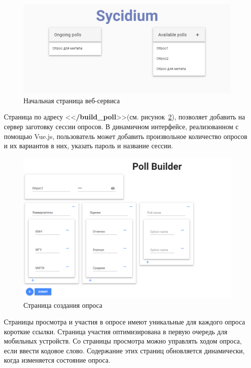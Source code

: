 \begin{figure}[H]
	\centering
	\includegraphics[width=\textwidth]{img/index.PNG}
	\caption{\label{fig:index} Начальная страница веб-сервиса}
\end{figure}

Страница по адресу <<\textbf{/build\_poll}>>(см. рисунок~\ref{fig:builder}), позволяет добавить на сервер заготовку сессии опросов. В динамичном интерфейсе, реализованном с помощью Vue.js, пользователь может добавить произвольное количество опросов и их вариантов в них, указать пароль и название сессии.

 \begin{figure}[H]
 	\centering
 	\includegraphics[width=\textwidth]{img/builder.PNG}
 	\caption{\label{fig:builder} Страница создания опроса}
 \end{figure}
 
  
Страницы просмотра и участия в опросе имеют уникальные для каждого опроса короткие ссылки. Страница участия оптимизирована в первую очередь для мобильных устройств. Со страницы просмотра можно управлять ходом опроса, если ввести кодовое слово. Содержание этих страниц обновляется динамически, когда изменяется состояние опроса.     
          
